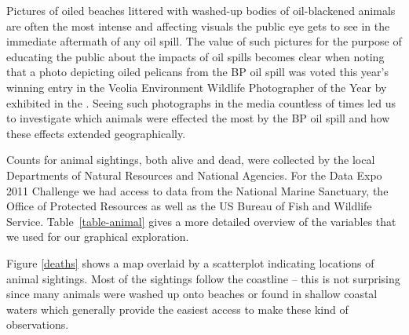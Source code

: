 \documentclass[authoryear,12pt]{elsarticle}
\begin{document}
{Pictures of oiled beaches littered with washed-up bodies of oil-blackened animals are often} the most {intense} and {affecting visuals the public eye gets to see} {in the immediate aftermath of any oil spill}. {The value of such pictures for the purpose of educating the public about the impacts of oil spills becomes clear when noting that a photo depicting oiled pelicans from the BP oil spill was voted} this year's winning entry in the Veolia Environment Wildlife Photographer of the Year by \citet{photo} {exhibited in the \citet{exhibition}}. {Seeing such photographs in the media countless of times led us to investigate which animals were effected the most by the BP oil spill and how these effects extended geographically.}



Counts for animal sightings, both alive and dead, {were} collected by the local Departments of Natural Resources and National Agencies. For the Data Expo 2011 Challenge we had access to data from the National Marine Sanctuary, the Office of Protected Resources as well as the US Bureau of Fish and Wildlife Service. Table~\ref{table-animal} gives a more detailed overview of the variables that we used for our graphical exploration. 

Figure \ref{deaths} shows a map overlaid by a scatterplot indicating locations of animal sightings. Most of the sightings follow the coastline  {-- this} is not surprising since  {many animals were washed up onto beaches or found in shallow coastal waters which generally provide} the easiest access to make these kind of observations. 

%
%
\end{document}
